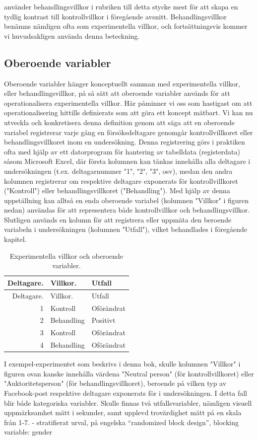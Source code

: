\documentclass[
]{book}
\begin{document}
använder behandlingsvillkor i rubriken till detta stycke mest för att skapa en tydlig kontrast till kontrollvillkor i föregående avsnitt. Behandlingsvillkor benämns nämligen ofta som experimentella villkor, och fortsättningsvis kommer vi huvudsakligen använda denna beteckning.

\hypertarget{sub07.4.2}{%
\subsection{Oberoende variabler}\label{sub07.4.2}}

Oberoende variabler hänger konceptuellt samman med experimentella villkor, eller behandlingsvillkor, på så sätt att oberoende variabler används för att operationalisera experimentella villkor. Här påminner vi oss som hastigast om att operationalisering hittills definierats som att göra ett koncept mätbart. Vi kan nu utveckla och konkretisera denna definition genom att säga att en oberoende variabel registrerar varje gång en försöksdeltagare genomgår kontrollvillkoret eller behandlingsvillkoret inom en undersökning. Denna registrering görs i praktiken ofta med hjälp av ett datorprogram för hantering av tabelldata (registerdata) såsom Microsoft Excel, där första kolumnen kan tänkas innehålla alla deltagare i undersökningen (t.ex. deltagarnummer "1", "2", "3", osv), medan den andra kolumnen registrerar om respektive deltagare exponerats för kontrollvillkoret ("Kontroll") eller behandlingsvillkoret ("Behandling"). Med hjälp av denna uppställning kan alltså en enda oberoende variabel (kolumnen "Villkor" i figuren nedan) användas för att representera både kontrollvillkor och behandlingsvillkor. Slutligen används en kolumn för att registrera eller uppmäta den beroende variabeln i undersökningen (kolumnen "Utfall"), vilket behandlades i föregående kapitel.

\begin{longtable}[]{@{}rll@{}}
\caption{\label{tab:tab-02-07-4-2-01}Experimentella villkor och oberoende variabler.}\tabularnewline
\toprule
Deltagare. & Villkor. & Utfall\tabularnewline
\midrule
\endfirsthead
\toprule
Deltagare. & Villkor. & Utfall\tabularnewline
\midrule
\endhead
1 & Kontroll & Oförändrat\tabularnewline
2 & Behandling & Positivt\tabularnewline
3 & Kontroll & Oförändrat\tabularnewline
4 & Behandling & Oförändrat\tabularnewline
\bottomrule
\end{longtable}

I exempel-experimentet som beskrivs i denna bok, skulle kolumnen "Villkor" i figuren ovan kanske innehålla värdena "Neutral person" (för kontrollvillkoret) eller "Auktoritetsperson" (för behandlingsvillkoret), beroende på vilken typ av Facebook-post respektive deltagare exponerats för i undersökningen. I detta fall blir både kategoriska variabler. Skulle finnas två utfallsvariabler, nämligen visuell uppmärksamhet mätt i sekunder, samt upplevd trovärdighet mätt på en skala från 1-7. - stratifierat urval, på engelska ``randomized block design'', blocking variable: gender
\end{document}
